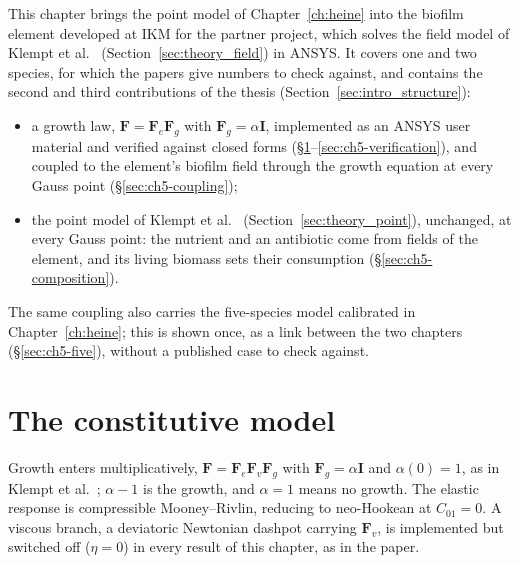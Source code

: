 This chapter brings the point model of Chapter~\ref{ch:heine} into the
biofilm element developed at IKM for the partner project, which solves the
field model of Klempt et al.~\cite{Klempt2024DiffusionDrivenGrowth}
(Section~\ref{sec:theory_field}) in ANSYS. It covers one and two species, for
which the papers give numbers to check against, and contains the second and
third contributions of the thesis (Section~\ref{sec:intro_structure}):
\begin{itemize}
\item a growth law, $\mathbf F=\mathbf F_e\mathbf F_g$ with
      $\mathbf F_g=\alpha\mathbf I$, implemented as an ANSYS user material
      and verified against closed forms (\S\ref{sec:ch5-model}--\ref{sec:ch5-verification}),
      and coupled to the element's biofilm field through the growth equation
      at every Gauss point (\S\ref{sec:ch5-coupling});
\item the point model of Klempt et al.~\cite{Klempt2026ContinuumBacterialGrowth}
      (Section~\ref{sec:theory_point}), unchanged, at every Gauss point: the nutrient
      and an antibiotic come from fields of the element, and its living biomass sets
      their consumption (\S\ref{sec:ch5-composition}).
\end{itemize}
The same coupling also carries the five-species model calibrated in
Chapter~\ref{ch:heine}; this is shown once, as a link between the two chapters
(\S\ref{sec:ch5-five}), without a published case to check against.

\section{The constitutive model}
\label{sec:ch5-model}

Growth enters multiplicatively,
$\mathbf F = \mathbf F_e \mathbf F_v \mathbf F_g$ with
$\mathbf F_g = \alpha\mathbf I$ and $\alpha(0)=1$, as in Klempt et
al.~\cite{Klempt2024DiffusionDrivenGrowth}; $\alpha-1$ is the growth, and
$\alpha=1$ means no growth. The elastic response is compressible
Mooney--Rivlin, reducing to neo-Hookean at $C_{01}=0$. A viscous branch, a
deviatoric Newtonian dashpot carrying $\mathbf F_v$, is implemented but
switched off ($\eta=0$) in every result of this chapter, as in the paper.


